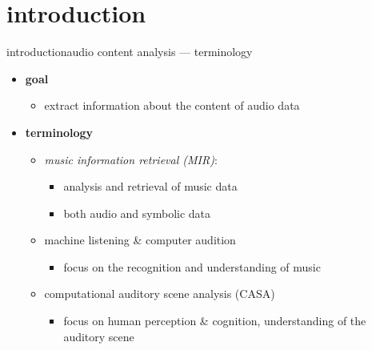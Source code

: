     \section[intro]{introduction}
        \begin{frame}{introduction}{audio content analysis --- terminology}
            \begin{itemize}
                \item   \textbf{goal}
                    \begin{itemize}
                        \item   extract information about the content of audio data
                    \end{itemize}
                \bigskip
                \item<2->   \textbf{terminology}
                    \begin{itemize}
                        \item	\textit{music information retrieval (MIR)}:
                            \begin{itemize}
                                \item   analysis and retrieval of music data 
                                \item   both audio and symbolic data
                            \end{itemize}
                                
                        \item	machine listening \& computer audition
                            \begin{itemize}
                                \item   focus on the recognition and understanding of music
                            \end{itemize}
                        \item	computational auditory scene analysis (CASA)
                            \begin{itemize}
                                \item   focus on human perception \& cognition, understanding of the auditory scene
                            \end{itemize}
                    \end{itemize}
           \end{itemize}
        \end{frame}
